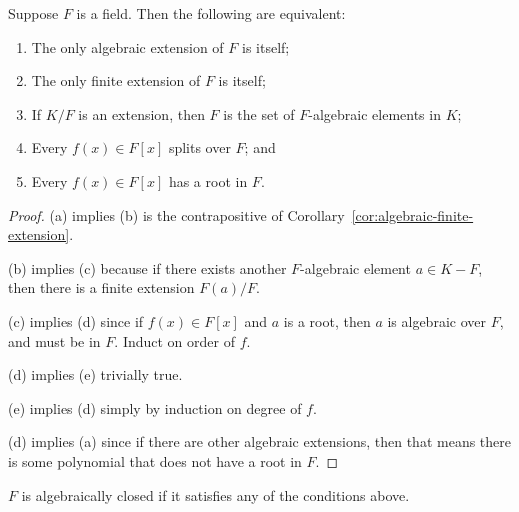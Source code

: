 \begin{lemma}
    Suppose \(F\) is a field.
    Then the following are equivalent:
    \begin{enumerate}[label={(\alph*)}, itemsep=0mm]
        \item The only algebraic extension of \(F\) is itself;
        \item The only finite extension of \(F\) is itself;
        \item If \(K/F\) is an extension,
            then \(F\) is the set of \(F\)-algebraic elements in \(K\);
        \item Every \(f(x) \in F[x]\) splits over \(F\); and
        \item Every \(f(x) \in F[x]\) has a root in \(F\).
    \end{enumerate}
\end{lemma}
\begin{proof}
    (a) implies (b) is the contrapositive of Corollary~\ref{cor:algebraic-finite-extension}.

    (b) implies (c) because if there exists another \(F\)-algebraic element \(a \in K-F\),
    then there is a finite extension \(F(a)/F\).

    (c) implies (d) since if \(f(x) \in F[x]\) and \(a\) is a root,
    then \(a\) is algebraic over \(F\), and must be in \(F\).
    Induct on order of \(f\).

    (d) implies (e) trivially true.

    (e) implies (d) simply by induction on degree of \(f\).

    (d) implies (a) since if there are other algebraic extensions,
    then that means there is some polynomial that does not have a root in \(F\).
\end{proof}
\begin{definition}
    \(F\) is algebraically closed if it satisfies any of the conditions above.
\end{definition}

